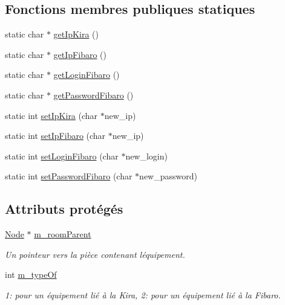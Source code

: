 \subsection*{Fonctions membres publiques statiques}
\begin{DoxyCompactItemize}
\item 
static char $\ast$ \hyperlink{class_e_p_1_1_equipment_adaffca0c6347dae9c4a50e43964470d7}{get\+Ip\+Kira} ()
\item 
static char $\ast$ \hyperlink{class_e_p_1_1_equipment_a7deb5f2f0fd0298440fd57d6e2e6c07d}{get\+Ip\+Fibaro} ()
\item 
static char $\ast$ \hyperlink{class_e_p_1_1_equipment_a81a3c8902b762f36114f265de34a2f4c}{get\+Login\+Fibaro} ()
\item 
static char $\ast$ \hyperlink{class_e_p_1_1_equipment_abc89eb422fe65d3fd3cba0e0024902ff}{get\+Password\+Fibaro} ()
\item 
static int \hyperlink{class_e_p_1_1_equipment_ad7e1a1a1b42188a16233215a908deca0}{set\+Ip\+Kira} (char $\ast$new\+\_\+ip)
\item 
static int \hyperlink{class_e_p_1_1_equipment_ae947b329b91e6d9cb37b618acc34a2a7}{set\+Ip\+Fibaro} (char $\ast$new\+\_\+ip)
\item 
static int \hyperlink{class_e_p_1_1_equipment_ab2bf8dd407ef5b0d998918cd6ab6a8a3}{set\+Login\+Fibaro} (char $\ast$new\+\_\+login)
\item 
static int \hyperlink{class_e_p_1_1_equipment_ad1abd0762bc1f17283307e6a102f0daa}{set\+Password\+Fibaro} (char $\ast$new\+\_\+password)
\end{DoxyCompactItemize}
\subsection*{Attributs protégés}
\begin{DoxyCompactItemize}
\item 
\hyperlink{class_e_p_1_1_node}{Node} $\ast$ \hyperlink{class_e_p_1_1_equipment_a826ee59574194978cd3e02e8824a0a5a}{m\+\_\+room\+Parent}\hypertarget{class_e_p_1_1_equipment_a826ee59574194978cd3e02e8824a0a5a}{}\label{class_e_p_1_1_equipment_a826ee59574194978cd3e02e8824a0a5a}

\begin{DoxyCompactList}\small\item\em Un pointeur vers la pièce contenant l\textquotesingle{}équipement. \end{DoxyCompactList}\item 
int \hyperlink{class_e_p_1_1_equipment_abf8f83a01b6843ffc15cc8b77254dbe3}{m\+\_\+type\+Of}\hypertarget{class_e_p_1_1_equipment_abf8f83a01b6843ffc15cc8b77254dbe3}{}\label{class_e_p_1_1_equipment_abf8f83a01b6843ffc15cc8b77254dbe3}

\begin{DoxyCompactList}\small\item\em 1\+: pour un équipement lié à la Kira, 2\+: pour un équipement lié à la Fibaro. \end{DoxyCompactList}\end{DoxyCompactItemize}
